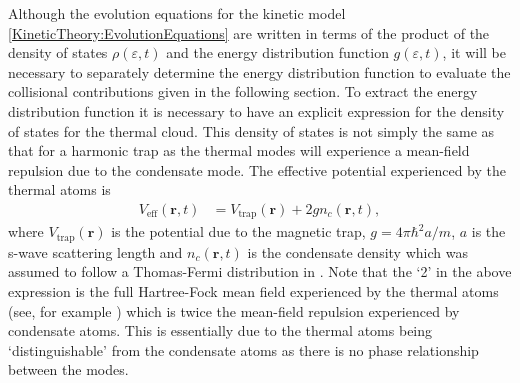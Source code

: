 Although the evolution equations for the kinetic model \eqref{KineticTheory:EvolutionEquations} are written in terms of the product of the density of states $\rho(\varepsilon, t)$ and the energy distribution function $g(\varepsilon, t)$, it will be necessary to separately determine the energy distribution function to evaluate the collisional contributions given in the following section. To extract the energy distribution function it is necessary to have an explicit expression for the density of states for the thermal cloud. This density of states is not simply the same as that for a harmonic trap as the thermal modes will experience a mean-field repulsion due to the condensate mode. The effective potential experienced by the thermal atoms is
\begin{align}
    V_\text{eff}(\bm{r}, t) &= V_\text{trap}(\bm{r}) + 2 g n_c(\bm{r}, t), \label{MethodsAppendix:QKTEffectivePotential}
\end{align}
where $V_\text{trap}(\bm{r})$ is the potential due to the magnetic trap, $g = 4\pi \hbar^2 a/m$, $a$ is the s-wave scattering length and $n_c(\bm{r}, t)$ is the condensate density which was assumed to follow a Thomas-Fermi distribution in .  Note that the `2' in the above expression is the full Hartree-Fock mean field experienced by the thermal atoms (see, for example \citep[Chapter 8]{PethickSmith}) which is twice the mean-field repulsion experienced by condensate atoms.  This is essentially due to the thermal atoms being `distinguishable' from the condensate atoms as there is no phase relationship between the modes.

